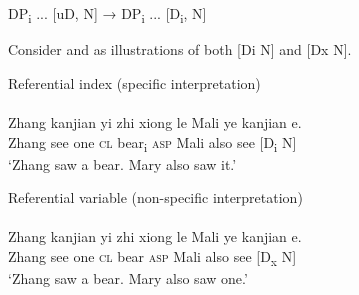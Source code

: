 \documentclass[output=paper]{LSP/langsci}
\begin{document}
\ea
\label{ex:li:8}
  {DP}{\textsubscript{i}} {... [uD, N]} {→}{ DP}{\textsubscript{i}}{ ... [}{D}{\textsubscript{i}}{, N]}
\z


Consider  and  as illustrations of both [Di N] and [Dx N].


\ea%
    \label{ex:li:9}
Referential index (specific interpretation)\\
\\
    \gll	Zhang  kanjian yi zhi   xiong le   Mali ye   kanjian       e.   \\
Zhang  see    one \textsc{cl}  bear\textsubscript{i} \textsc{asp}   Mali also   see    [D\textsubscript{i} N]\textbf{} 	\\
    \glt `Zhang saw a bear. Mary also saw it.'
    \z


\ea%
    \label{ex:li:10}
Referential variable (non-specific interpretation)\\
\\
    \gll  Zhang  kanjian   yi zhi   xiong le Mali   ye   kanjian      e. \\
	Zhang  see      one \textsc{cl}   bear \textsc{asp}   Mali   also   see        [D\textsubscript{x} N]\\
    \glt `Zhang saw a bear. Mary also saw one.'
    \z
\end{document}
